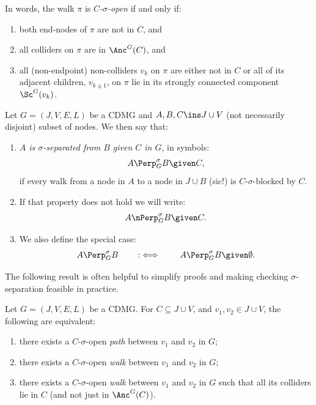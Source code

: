 \begin{Rem}
    In words, the walk $\pi$ is \emph{$C$-$\sigma$-open}  if and only if:
  \begin{enumerate}[label=\roman*.)]
    \item both end-nodes of $\pi$ are not in $C$, and
    \item all colliders on $\pi$ are in $\Anc^G(C)$, and
    \item all (non-endpoint) non-colliders $v_k$ on $\pi$ are either not in $C$ or all of its adjacent children, $v_{k\pm 1}$,
        on $\pi$ lie in its strongly connected component $\Sc^G(v_k)$. 
  \end{enumerate}
\end{Rem}



\begin{Def}
    Let $G=(J,V,E,L)$ be a CDMG and $A,B,C \ins J \cup V$ (not necessarily disjoint) subset of nodes.
    We then say that:
    \begin{enumerate}
        \item \emph{$A$ is $\sigma$-separated from $B$ given $C$ in $G$}, in symbols:
    \[ A \Perp^\sigma_G B \given C, \]
    if every walk from a node in $A$ to a node in $J \cup B$ (sic!) is $C$-$\sigma$-blocked by $C$.
        \item If that property does not hold we will write:
            \[ A \nPerp^\sigma_G B \given C. \]
        \item We also define the special case:
                \[ A \Perp^\sigma_G B \qquad :\iff \qquad A \Perp^\sigma_GB \given \emptyset.\]
    \end{enumerate}
\end{Def}

The following result is often helpful to simplify proofs and making checking $\sigma$-separation feasible in practice.

\begin{Prp}\label{prp:sigma_opens}
  Let $G=(J,V,E,L)$ be a CDMG. For $C \subseteq J \cup V$, and $v_1, v_2 \in J \cup V$, the following are
  equivalent:
  \begin{enumerate}
      \item there exists a $C$-$\sigma$-open \emph{path} between $v_1$ and $v_2$ in $G$;
      \item there exists a $C$-$\sigma$-open \emph{walk} between $v_1$ and $v_2$ in $G$;
      \item there exists a $C$-$\sigma$-open \emph{walk} between $v_1$ and $v_2$ in $G$ such that all its colliders lie in $C$ (and not just in $\Anc^G(C)$).
  \end{enumerate}
\end{Prp}


